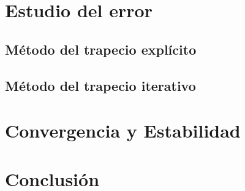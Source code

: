 \documentclass{article}
\theoremstyle{theorem-style}  %
\theoremstyle{definition}
\theoremstyle{example-style}
\begin{document}


\section{Estudio del error}

	\subsection{Método del trapecio explícito}
	
	\subsection{Método del trapecio iterativo}



\section{Convergencia y Estabilidad}


\section{Conclusión}



\printbibliography
\end{document}
